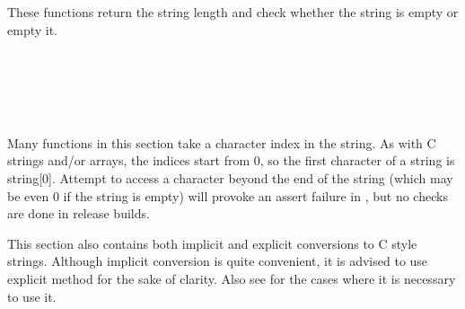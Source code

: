 \\
\\

\label{lengthfunctionsinwxstring}

These functions return the string length and check whether the string is empty
or empty it.

\\
\\
\\
\\

\label{characteraccessinwxstring}

Many functions in this section take a character index in the string. As with C
strings and/or arrays, the indices start from $0$, so the first character of a
string is string[$0$]. Attempt to access a character beyond the end of the
string (which may be even $0$ if the string is empty) will provoke an assert
failure in , but no checks are done in
release builds.

This section also contains both implicit and explicit conversions to C style
strings. Although implicit conversion is quite convenient, it is advised to use
explicit  method for the sake of clarity. Also
see  for the cases where it is necessary to
use it.

\\
\\
\\
\\
\\
\\
\\
\\
\\

\label{concatenationinwxstring}

